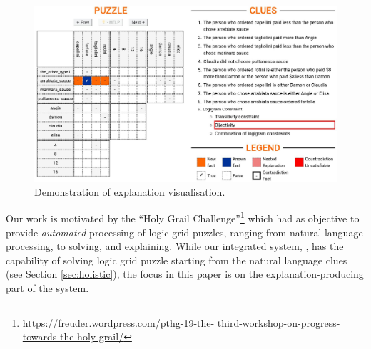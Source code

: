 \begin{figure}[ht]
\centering
\includegraphics[width=0.9\linewidth]{figures/introduction.jpeg}
\caption{Demonstration of explanation visualisation.}
\label{fig:zebrascreen}
\end{figure}

Our work is motivated by the ``Holy Grail Challenge''\footnote{\url{https://freuder.wordpress.com/pthg-19-the- third-workshop-on-progress-towards-the-holy-grail/}} which had as objective to provide \textit{automated} processing of logic grid puzzles, ranging from natural language processing, to solving, and explaining.
While our integrated system, \ourtool, has the capability of solving logic grid puzzle starting from the natural language clues (see Section \ref{sec:holistic}), the focus in this paper is on the explanation-producing part of the system.

